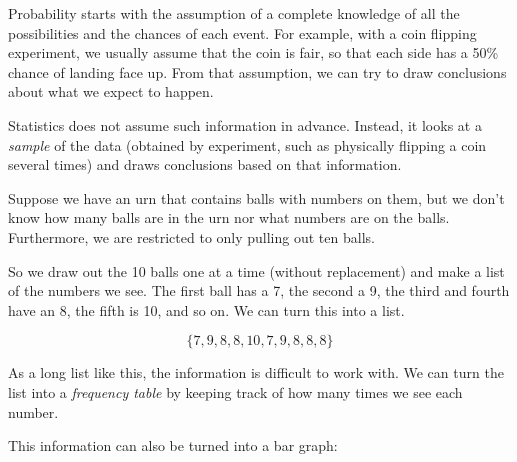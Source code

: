 \documentclass{ximera}
\begin{document}
Probability starts with the assumption of a complete knowledge of all the possibilities and the chances of each event. For example, with a coin flipping experiment, we usually assume that the coin is fair, so that each side has a 50\% chance of landing face up. From that assumption, we can try to draw conclusions about what we expect to happen.

Statistics does not assume such information in advance. Instead, it looks at a \emph{sample} of the data (obtained by experiment, such as physically flipping a coin several times) and draws conclusions based on that information.

Suppose we have an urn that contains balls with numbers on them, but we don't know how many balls are in the urn nor what numbers are on the balls. Furthermore, we are restricted to only pulling out ten balls.

So we draw out the 10 balls one at a time (without replacement) and make a list of the numbers we see. The first ball has a 7, the second a 9, the third and fourth have an 8, the fifth is 10, and so on. We can turn this into a list.

\[ \{ 7, 9, 8, 8, 10, 7, 9, 8, 8, 8 \} \]

As a long list like this, the information is difficult to work with. We can turn the list into a \emph{frequency table} by keeping track of how many times we see each number.

\begin{image}
\end{image}

This information can also be turned into a bar graph:

\begin{image}
\end{image}
\end{document}
